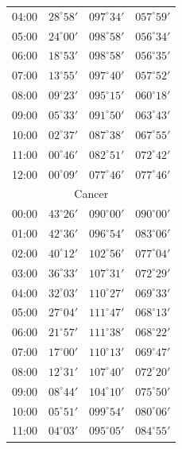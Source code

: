 \begin{table}[!h]
\begin{Parallel}{}{}
{{\begin{tabular}{l|lll}
04:00 & $28^\circ 58'$ & $097^\circ 34'$& $057^\circ 59'$ \\
05:00 & $24^\circ 00'$ & $098^\circ 58'$& $056^\circ 34'$ \\
06:00 & $18^\circ 53'$ & $098^\circ 58'$& $056^\circ 35'$ \\
07:00 & $13^\circ 55'$ & $097^\circ 40'$& $057^\circ 52'$ \\
08:00 & $09^\circ 23'$ & $095^\circ 15'$& $060^\circ 18'$ \\
09:00 & $05^\circ 33'$ & $091^\circ 50'$& $063^\circ 43'$ \\
10:00 & $02^\circ 37'$ & $087^\circ 38'$& $067^\circ 55'$ \\
11:00 & $00^\circ 46'$ & $082^\circ 51'$& $072^\circ 42'$ \\
12:00 & $00^\circ 09'$ & $077^\circ 46'$& $077^\circ 46'$ \\
\multicolumn{4}{c}{Cancer}\\
00:00 & $43^\circ 26'$ & $090^\circ 00'$& $090^\circ 00'$ \\
01:00 & $42^\circ 36'$ & $096^\circ 54'$& $083^\circ 06'$ \\
02:00 & $40^\circ 12'$ & $102^\circ 56'$& $077^\circ 04'$ \\
03:00 & $36^\circ 33'$ & $107^\circ 31'$& $072^\circ 29'$ \\
04:00 & $32^\circ 03'$ & $110^\circ 27'$& $069^\circ 33'$ \\
05:00 & $27^\circ 04'$ & $111^\circ 47'$& $068^\circ 13'$ \\
06:00 & $21^\circ 57'$ & $111^\circ 38'$& $068^\circ 22'$ \\
07:00 & $17^\circ 00'$ & $110^\circ 13'$& $069^\circ 47'$ \\
08:00 & $12^\circ 31'$ & $107^\circ 40'$& $072^\circ 20'$ \\
09:00 & $08^\circ 44'$ & $104^\circ 10'$& $075^\circ 50'$ \\
10:00 & $05^\circ 51'$ & $099^\circ 54'$& $080^\circ 06'$ \\
11:00 & $04^\circ 03'$ & $095^\circ 05'$& $084^\circ 55'$ \\
\end{tabular}
}}
\end{Parallel}
\end{table}
